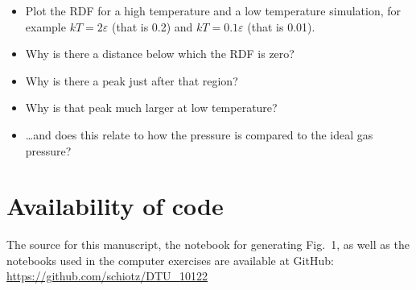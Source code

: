 \documentclass[a4paper,11pt]{article}
\begin{document}
\begin{itemize}
\item Plot the RDF for a high temperature and a low temperature
  simulation, for example $kT = 2 \varepsilon$ (that is 0.2) and $kT =
  0.1 \varepsilon$ (that is 0.01).
\item Why is there a distance below which the RDF is zero?
\item Why is there a peak just after that region?
\item Why is that peak much larger at low temperature?
\item \ldots and does this relate to how the pressure is compared to
  the ideal gas pressure?
\end{itemize}




\section*{Availability of code}

The source for this manuscript, the notebook for generating Fig.~1, as
well as the notebooks used in the computer exercises are available at
GitHub:\\
\url{https://github.com/schiotz/DTU_10122}
\end{document}
